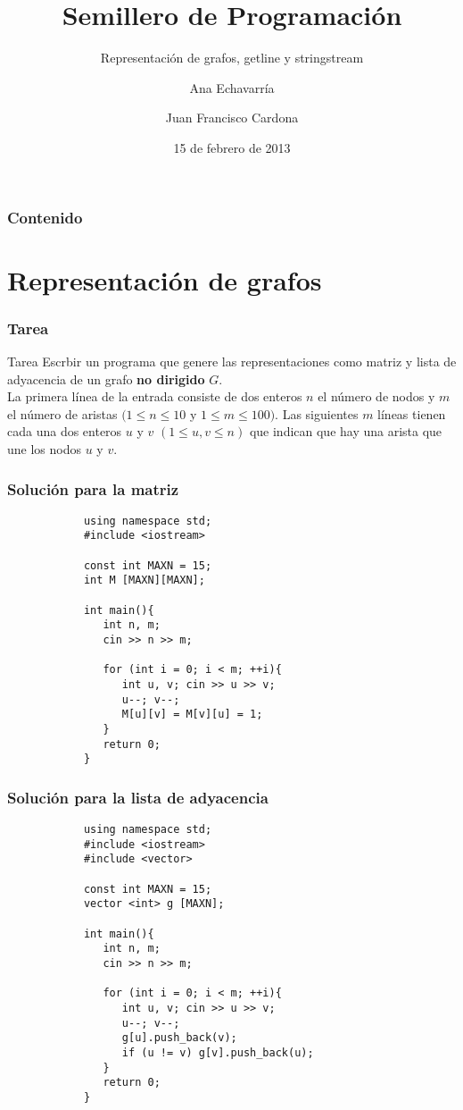 \documentclass{beamer}
\title{Semillero de Programación}
\subtitle{Representación de grafos, getline y stringstream}
\author{Ana Echavarría \and Juan Francisco Cardona}
\institute{Universidad EAFIT}
\date{15 de febrero de 2013}
\begin{document}
\begin{frame}
	\titlepage
\end{frame}

\begin{frame}
	\frametitle{Contenido}
	\tableofcontents
\end{frame}

\section{Representación de grafos}
	\begin{frame}
		\frametitle{Tarea}
		\begin{alertblock}{Tarea}
			Escrbir un programa que genere las representaciones como matriz y lista de adyacencia de un grafo \textbf{no dirigido} $G$.\\
			La primera línea de la entrada consiste de dos enteros $n$ el número de nodos y $m$ el número de aristas $(1 \leq n \leq 10$ y $1 \leq m \leq 100)$. Las siguientes $m$ líneas tienen cada una dos enteros $u$ y $v$ $(1 \leq u, v \leq n)$ que indican que hay una arista que une los nodos $u$ y $v$.
		\end{alertblock}
	\end{frame}
	
	\begin{frame}[fragile]
		\frametitle{Solución para la matriz}
		\begin{lstlisting}
			using namespace std;
			#include <iostream>

			const int MAXN = 15;
			int M [MAXN][MAXN];

			int main(){
			   int n, m;
			   cin >> n >> m;

			   for (int i = 0; i < m; ++i){
			      int u, v; cin >> u >> v;
			      u--; v--;
			      M[u][v] = M[v][u] = 1;
			   }
			   return 0;
			}
		\end{lstlisting}
	\end{frame}
	
	\begin{frame}[fragile]
		\frametitle{Solución para la lista de adyacencia}
		\begin{lstlisting}
			using namespace std;
			#include <iostream>
			#include <vector>

			const int MAXN = 15;
			vector <int> g [MAXN];

			int main(){
			   int n, m;
			   cin >> n >> m;

			   for (int i = 0; i < m; ++i){
			      int u, v; cin >> u >> v;
			      u--; v--;
			      g[u].push_back(v);
			      if (u != v) g[v].push_back(u);
			   }
			   return 0;
			}
		\end{lstlisting}
	\end{frame}
	
\end{document}

